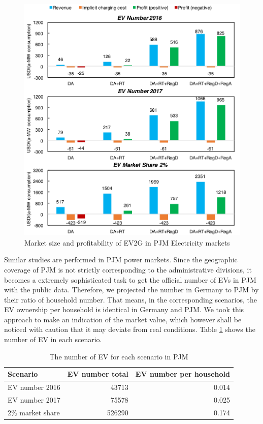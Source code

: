 \begin{figure}[h!]
	\centering
	\includegraphics[width=0.95\linewidth]{Figures/PJM_EV_profit}
	\caption{Market size and profitability of EV2G in PJM Electricity markets}
	\label{fig:PJM_EV}
\end{figure}

Similar studies are performed in PJM power markets. Since the geographic coverage of PJM is not strictly corresponding to the administrative divisions, it becomes a extremely sophisticated task to get the official number of EVs in PJM with the public data. Therefore, we projected the number in Germany to PJM by their ratio of household number. That means, in the corresponding scenarios, the EV ownership per household is identical in Germany and PJM. We took this approach to make an indication of the market value, which however shall be noticed with caution that it may deviate from real conditions. 
Table \ref{tab:ev-number-scenario-PJM} shows the number of EV in each scenario.

\begin{table}
	\centering
	\begin{tabular}{ l r r }
		\hline
		\textbf{Scenario} & \textbf{EV number total} & \textbf{EV number per household} \\
		\hline
		EV number 2016 &  \num{43713} & \num{0.014} \\
		EV number 2017 &  \num{75578} & \num{0.025} \\
		2\% market share &  \num{526290} & \num{0.174} \\
		\hline
	\end{tabular}
	\caption{The number of EV for each scenario in PJM}\label{tab:ev-number-scenario-PJM}
\end{table}


